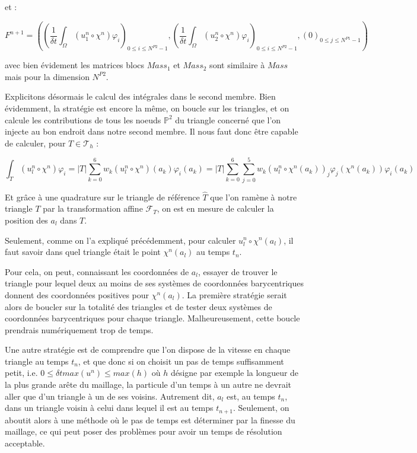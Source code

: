 \documentclass[a4paper,12pt]{article}
\begin{document}
et :

\begin{equation}
F^{n+1} = \left( \left( \frac{1}{\delta t} \int_\Omega \left( u^{n}_{1} \circ \chi^n \right) \varphi_i \right)_{0 \leq i \leq N^{P2}-1}, \left( \frac{1}{\delta t} \int_\Omega \left( u^{n}_{2} \circ \chi^n \right) \varphi_i \right)_{0 \leq i \leq N^{P2}-1}, \left( 0 \right)_{0 \leq j \leq N^{P1}-1} \right)
\end{equation}

avec bien évidement les matrices blocs $Mass_1$ et $Mass_2$ sont similaire à $Mass$ mais pour la dimension $N^{P2}$.

Explicitons désormais le calcul des intégrales dans le second membre. Bien évidemment, la stratégie est encore la même, on boucle sur les triangles, et on calcule les contributions de tous les noeuds $\mathbb{P}^2$ du triangle concerné que l'on injecte au bon endroit dans notre second membre. Il nous faut donc être capable de calculer, pour $T \in \mathcal{T}_h$ :

\begin{equation*}
\int_T \left( u_{l}^n \circ \chi^n \right) \varphi_i = |T| \sum_{k=0}^{6} w_k \left( u_{l}^{n} \circ \chi^n \right) (a_k) \varphi_i (a_k) = |T| \sum_{k=0}^{6} \sum_{j=0}^{5} w_k (u_{l}^{n} \circ \chi^n (a_k) )_j \varphi_j (\chi^n (a_k)) \varphi_i (a_k) 
\end{equation*}

Et grâce à une quadrature sur le triangle de référence $\widehat{T}$ que l'on ramène à notre triangle $T$ par la transformation affine $\mathcal{F}_T$, on est en mesure de calculer la position des $a_l$ dans $T$.

Seulement, comme on l'a expliqué précédemment, pour calculer $u_{l}^{n} \circ \chi^n (a_l)$, il faut savoir dans quel triangle était le point $\chi^n (a_l)$ au temps $t_n$.

Pour cela, on peut, connaissant les coordonnées de $a_l$, essayer de trouver le triangle pour lequel deux au moins de ses systèmes de coordonnées barycentriques donnent des coordonnées positives pour $\chi^n (a_l)$. La première stratégie serait alors de boucler sur la totalité des triangles et de tester deux systèmes de coordonnées barycentriques pour chaque triangle. Malheureusement, cette boucle prendrais numériquement trop de temps.

Une autre stratégie est de comprendre que l'on dispose de la vitesse en chaque triangle au temps $t_n$, et que donc si on choisit un pas de temps suffisamment petit, i.e. $0 \leq \delta t max(u^n) \leq max(h) $ où $h$ désigne par exemple la longueur de la plus grande arête du maillage, la particule d'un temps à un autre ne devrait aller que d'un triangle à un de ses voisins. Autrement dit, $a_l$ est, au temps $t_n$, dans un triangle voisin à celui dans lequel il est au temps $t_{n+1}$. Seulement, on aboutit alors à une méthode où le pas de temps est déterminer par la finesse du maillage, ce qui peut poser des problèmes pour avoir un temps de résolution acceptable.
\end{document}
